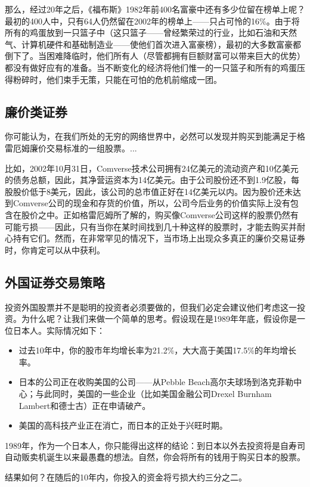 \documentclass[12pt,oneside]{book}
\begin{document}
那么，经过20年之后，《福布斯》1982年前400名富豪中还有多少位留在榜单上呢？最初的400人中，只有64人仍然留在2002年的榜单上——只占可怜的16\%。由于将所有的鸡蛋放到一只篮子中（这只篮子——曾经繁荣过的行业，比如石油和天然气、计算机硬件和基础制造业——使他们首次进入富豪榜），最初的大多数富豪都倒下了。当困难降临时，他们所有人（尽管都拥有巨额财富可以带来巨大的优势）都没有做好应有的准备。当不断变化的经济将他们惟一的一只篮子和所有的鸡蛋压得粉碎时，他们束手无策，只能在可怕的危机前缩成一团。

\subsection{廉价类证券}
你可能认为，在我们所处的无穷的网络世界中，必然可以发现并购买到能满足于格雷厄姆廉价交易标准的一组股票。...

比如，2002年10月31日，Comverse技术公司拥有24亿美元的流动资产和10亿美元的债务总额，因此，其净营运资本为14亿美元。由于公司股份还不到1.9亿股，每股股价低于8美元，因此，该公司的总市值正好在14亿美元以内。因为股价还未达到Comverse公司的现金和存货的价值，所以，公司今后业务的价值实际上没有包含在股价之中。正如格雷厄姆所了解的，购买像Comverse公司这样的股票仍然有可能亏损——因此，只有当你在某时间找到几十种这样的股票时，才能去购买并耐心持有它们。然而，在非常罕见的情况下，当市场上出现众多真正的廉价交易证券时，你肯定可以从中获利。

\subsection{外国证券交易策略}
投资外国股票并不是聪明的投资者必须要做的，但我们必定会建议他们考虑这一投资。为什么呢？让我们来做一个简单的思考。假设现在是1989年年底，假设你是一位日本人。实际情况如下：

\begin{itemize}
\item 过去10年中，你的股市年均增长率为21.2\%，大大高于美国17.5\%的年均增长率。
\item 日本的公司正在收购美国的公司——从Pebble Beach高尔夫球场到洛克菲勒中心；与此同时，美国的一些企业（比如美国金融公司Drexel Burnham Lambert和德士古）正在申请破产。
\item 美国的高科技产业正在消亡，而日本的正处于兴旺时期。
\end{itemize}

1989年，作为一个日本人，你只能得出这样的结论：到日本以外去投资将是自寿司自动贩卖机诞生以来最愚蠢的想法。自然，你会将所有的钱用于购买日本的股票。

结果如何？在随后的10年内，你投入的资金将亏损大约三分之二。
\end{document}
